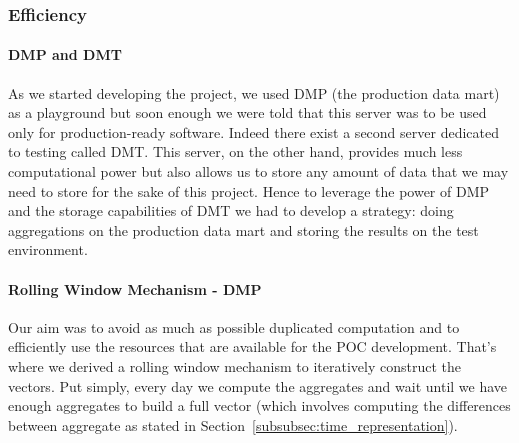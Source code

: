 \subsubsection{Efficiency}
\paragraph{DMP and DMT}
As we started developing the project, we used DMP (the production data mart) as a playground but soon enough we were told that this server was to be used only for production-ready software. Indeed there exist a second server dedicated to testing called DMT. This server, on the other hand, provides much less computational power but also allows us to store any amount of data that we may need to store for the sake of this project. Hence to leverage the power of DMP and the storage capabilities of DMT we had to develop a strategy: doing aggregations on the production data mart and storing the results on the test environment.


\paragraph{Rolling Window Mechanism - DMP}
Our aim was to avoid as much as possible duplicated computation and to efficiently use the resources that are available for the POC development. That's where we derived a rolling window mechanism to iteratively construct the vectors. Put simply, every day we compute the aggregates and wait until we have enough aggregates to build a full vector (which involves computing the differences between aggregate as stated in Section~\ref{subsubsec:time_representation}). 

